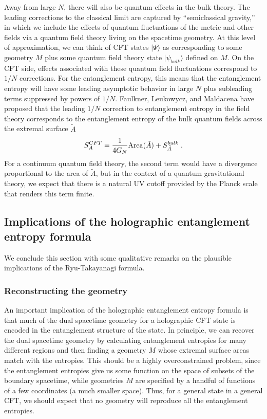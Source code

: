 \documentclass[12pt,epsf]{article}
\newcommand{\be}{\begin{equation}}
\newcommand{\ee}{\end{equation}}
\begin{document}
Away from large $N$, there will also be quantum effects in the bulk theory. The leading corrections to the classical limit are captured by ``semiclassical gravity,'' in which we include the effects of quantum fluctuations of the metric and other fields via a quantum field theory living on the spacetime geometry. At this level of approximation, we can think of CFT states $|\Psi \rangle$ as corresponding to some geometry $M$ plus some quantum field theory state $|\psi_{bulk} \rangle$ defined on $M$. On the CFT side, effects associated with these quantum field fluctuations correspond to $1/N$ corrections. For the entanglement entropy, this means that the entanglement entropy will have some leading asymptotic behavior in large $N$ plus subleading terms suppressed by powers of $1/N$. Faulkner, Leukowycz, and Maldacena have proposed \cite{Faulkner:2013ana} that the leading  $1/N$ correction to entanglement entropy in the field theory corresponds to the entanglement entropy of the bulk quantum fields across the extremal surface $\tilde{A}$
\be
\label{FLM}
S^{CFT}_A = {1 \over 4 G_N} {\rm Area}(\tilde{A}) + S^{bulk}_{\tilde{A}} \; .
\ee
For a continuum quantum field theory, the second term would have a divergence proportional to the area of $\tilde{A}$, but in the context of a quantum gravitational theory, we expect that there is a natural UV cutoff provided by the Planck scale that renders this term finite.

\subsection{Implications of the holographic entanglement entropy formula}

We conclude this section with some qualitative remarks on the plausible implications of the Ryu-Takayanagi formula.

\subsubsection*{Reconstructing the geometry}

An important implication of the holographic entanglement entropy formula is that much of the dual spacetime geometry for a holographic CFT state is encoded in the entanglement structure of the state. In principle, we can recover the dual spacetime geometry by calculating entanglement entropies for many different regions and then finding a geometry $M$ whose extremal surface areas match with the entropies. This should be a highly overconstrained problem, since the entanglement entropies give us some function on the space of subsets of the boundary spacetime, while geometries $M$ are specified by a handful of functions of a few coordinates (a much smaller space). Thus, for a general state in a general CFT, we should expect that no geometry will reproduce all the entanglement entropies.
\end{document}
